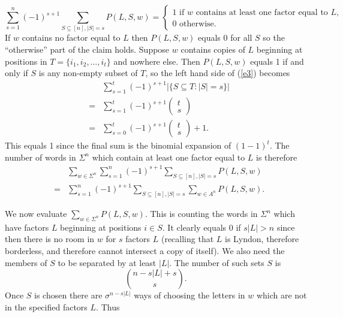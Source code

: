 \documentclass[11pt]{amsart}
\newcommand{\1}{\bar{1}}
\theoremstyle{plain}
\theoremstyle{definition}
\theoremstyle{remark}
\begin{document}
\begin{equation} \label{e3} \sum_{s=1}^n (-1)^{s+1} \sum_{S \subseteq [n],|S|=s}P(L,S,w)= \begin{cases}
\text{$1$ if $w$ contains at least one factor equal to $L$}, \\ \text{$0$ otherwise}. \end{cases}
 \end{equation}  If $w$ contains no factor equal to $L$ then $P(L,S,w)$ equals 0 for all $S$ so the ``otherwise'' part of the claim holds.
Suppose $w$ contains copies of $L$ beginning at positions in $T=\{i_1,i_2,\dots,i_t\}$ and nowhere else. Then $P(L,S,w)$ equals 1 if and only if $S$ is any non-empty subset of $T$, so the left hand side of (\ref{e3}) becomes
\begin{eqnarray*}
&&\sum_{s=1}^t (-1)^{s+1} |\{S\subseteq T:|S|=s\}|\\
&=&\sum_{s=1}^t (-1)^{s+1} \left  ( \begin{array}{c} t\\s \end{array} \right )\\
&=&\sum_{s=0}^t (-1)^{s+1} \left  ( \begin{array}{c} t\\s \end{array} \right )+1.
\end{eqnarray*}  This equals 1 since the final sum is the binomial expansion of $(1-1)^t$.  The number of words  in $\Sigma^n$ which contain at least one factor equal to $L$ is therefore
\begin{eqnarray}
\nonumber &&\sum_{w \in \Sigma^n}\sum_{s=1}^n  (-1)^{s+1} \sum_{S \subseteq [n],|S|=s} P(L,S,w)\\
\label{e4} &=& \sum_{s=1}^n  (-1)^{s+1} \sum_{S \subseteq [n],|S|=s}\sum_{w \in A^n} P(L,S,w).
\end{eqnarray}

We now evaluate $\sum_{w \in \Sigma^n} P(L,S,w)$.    This is counting the words in $\Sigma^n$ which have factors $L$ beginning at positions $i \in S$. It clearly equals 0 if $s|L|>n$ since then there is no room in $w$ for $s$ factors $L$ (recalling that $L$ is Lyndon, therefore borderless, and therefore cannot intersect a copy of itself). We also need the members of $S$ to be separated by at least $|L|$. The number of such sets $S$ is $${{n-s|L|+s} \choose {s}}.$$  Once $S$ is chosen there are $\sigma^{n-s|L|}$ ways of choosing the letters in $w$ which are not in the specified factors $L$.  Thus
\end{document}
